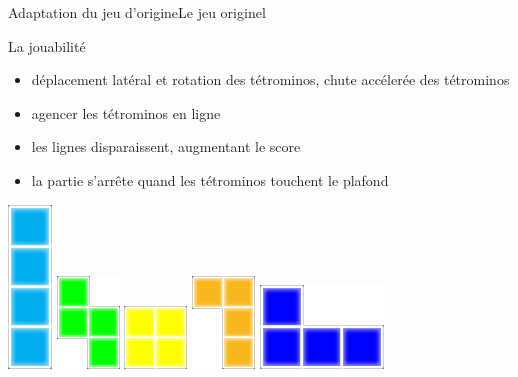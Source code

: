 \documentclass[french]{beamer}
\begin{document}
\begin{frame}{Adaptation du jeu d'origine}{Le jeu originel}
	\begin{block}{La jouabilité}
		\begin{itemize}
			\item déplacement latéral et rotation des tétrominos, chute accélerée des tétrominos
			\item agencer les tétrominos en ligne
			\item les lignes disparaissent, augmentant le score
			\item la partie s'arrête quand les tétrominos touchent le plafond
		\end{itemize}

	\end{block}

	\begin{center}
		\includegraphics[scale=0.3]{img/1.png}
		\includegraphics[scale=0.4]{img/2.png}
		\includegraphics[scale=0.4]{img/3.png}
		\includegraphics[scale=0.4]{img/4.png}
		\includegraphics[scale=0.3]{img/5.png}

\end{center}
\end{frame}
\end{document}
